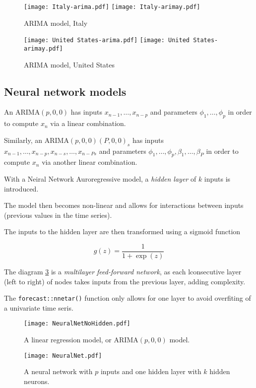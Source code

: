 \begin{figure}[H]
  \texttt{[image: Italy-arima.pdf]} \label{fig:italy-arima}
\endminipage\hfill
{}
  \texttt{[image: Italy-arimay.pdf]} \label{fig:italy-arimay}
\endminipage
\caption{ARIMA model, Italy}
\end{figure}

\begin{figure}[H]
  \texttt{[image: United States-arima.pdf]} \label{fig:usa-arima}
\endminipage\hfill
{}
  \texttt{[image: United States-arimay.pdf]} \label{fig:usa-arimay}
\endminipage
\caption{ARIMA model, United States}
\end{figure}

\subsection{Neural network models}

An ARIMA$(p,0,0)$ has inputs $x_{n-1},\dots,x_{n-p}$ and parameters $\phi_{1},\dots,\phi_{p}$ in order to compute $x_n$ via a linear combination.

Similarly, an ARIMA$(p,0,0)(P,0,0)_s$ has inputs $x_{n-1},\dots,x_{n-p}, x_{n-s},\dots,x_{n-Ps}$ and parameters $\phi_{1},\dots,\phi_{p}, \beta_1,\dots,\beta_P$ in order to compute $x_n$ via another linear combination.

With a Neiral Network Auroregressive model, a \textit{hidden layer} of $k$ inputs is introduced.

The model then becomes non-linear and allows for interactions between inputs (previous values in the time series).

The inputs to the hidden layer are then transformed using a sigmoid function

\begin{equation}\label{eq:sigmoid}
g(z)=\frac{1}{1+\exp(z)}
\end{equation}

The diagram \ref{fig:nnet} is a \textit{multilayer feed-forward network}, as each lconsecutive layer (left to right) of nodes takes inputs from the previous layer, adding complexity.

The \verb|forecast::nnetar()| function only allows for one layer to avoid overfiting of a univariate time seris.



\begin{figure}[H]
\texttt{[image: NeuralNetNoHidden.pdf]} \label{fig:nnetnohidden}
\caption{A linear regression model, or ARIMA$(p,0,0)$ model.}
\endminipage\hfill
{}
\texttt{[image: NeuralNet.pdf]} \label{fig:nnet}
\caption{A neural network with $p$ inputs and one hidden layer with $k$ hidden neurons.}
\endminipage
\end{figure}

